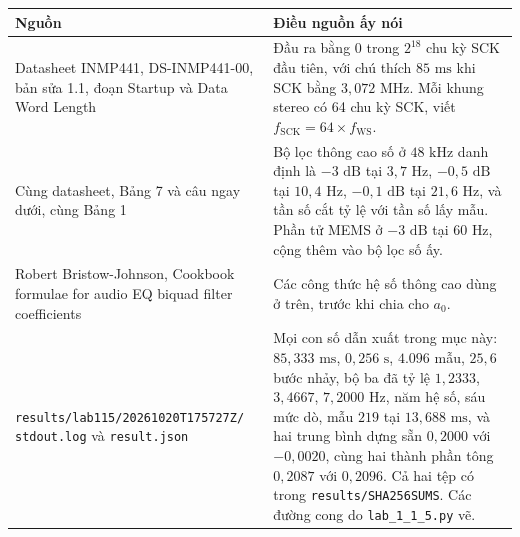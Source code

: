 \documentclass[11pt,a4paper]{article}
\begin{document}
\begin{center}
\small
\begin{tabular}{p{} p{}}
\toprule
Nguồn & Điều nguồn ấy nói \\
\midrule
Datasheet INMP441, DS-INMP441-00, bản sửa 1.1, đoạn Startup và Data Word Length &
Đầu ra bằng 0 trong $2^{18}$ chu kỳ SCK đầu tiên, với chú thích $85\text{ ms}$ khi SCK bằng $3{,}072\text{ MHz}$. Mỗi khung stereo có 64 chu kỳ SCK, viết $f_{\mathrm{SCK}} = 64 \times f_{\mathrm{WS}}$. \\
\addlinespace
Cùng datasheet, Bảng 7 và câu ngay dưới, cùng Bảng 1 &
Bộ lọc thông cao số ở $48\text{ kHz}$ danh định là $-3\text{ dB}$ tại $3{,}7\text{ Hz}$, $-0{,}5\text{ dB}$ tại $10{,}4\text{ Hz}$, $-0{,}1\text{ dB}$ tại $21{,}6\text{ Hz}$, và tần số cắt tỷ lệ với tần số lấy mẫu. Phần tử MEMS ở $-3\text{ dB}$ tại $60\text{ Hz}$, cộng thêm vào bộ lọc số ấy. \\
\addlinespace
Robert Bristow-Johnson, Cookbook formulae for audio EQ biquad filter coefficients &
Các công thức hệ số thông cao dùng ở trên, trước khi chia cho $a_0$. \\
\addlinespace
\texttt{results/lab115/20261020T175727Z/} \texttt{stdout.log} và \texttt{result.json} &
Mọi con số dẫn xuất trong mục này: $85{,}333\text{ ms}$, $0{,}256\text{ s}$, $4.096$ mẫu, $25{,}6$ bước nhảy, bộ ba đã tỷ lệ $1{,}2333$, $3{,}4667$, $7{,}2000\text{ Hz}$, năm hệ số, sáu mức dò, mẫu $219$ tại $13{,}688\text{ ms}$, và hai trung bình dựng sẵn $0{,}2000$ với $-0{,}0020$, cùng hai thành phần tông $0{,}2087$ với $0{,}2096$. Cả hai tệp có trong \texttt{results/SHA256SUMS}. Các đường cong do \texttt{lab\_1\_1\_5.py} vẽ. \\
\bottomrule
\end{tabular}
\end{center}
\end{document}
